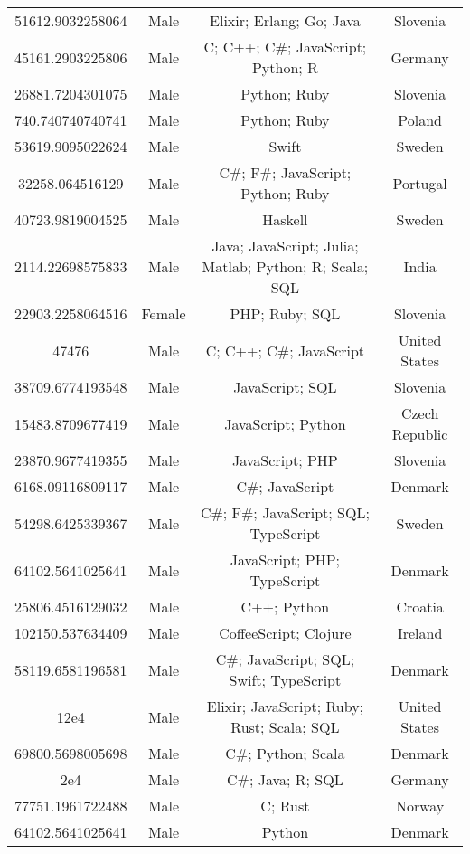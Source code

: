 \begin{center}
\begin{tabular}{ |c|c|c|c| }
51612.9032258064  &  Male  &  Elixir; Erlang; Go; Java  &  Slovenia  \\ 
45161.2903225806  &  Male  &  C; C++; C\#; JavaScript; Python; R  &  Germany  \\ 
26881.7204301075  &  Male  &  Python; Ruby  &  Slovenia  \\ 
740.740740740741  &  Male  &  Python; Ruby  &  Poland  \\ 
53619.9095022624  &  Male  &  Swift  &  Sweden  \\ 
32258.064516129  &  Male  &  C\#; F\#; JavaScript; Python; Ruby  &  Portugal  \\ 
40723.9819004525  &  Male  &  Haskell  &  Sweden  \\ 
2114.22698575833  &  Male  &  Java; JavaScript; Julia; Matlab; Python; R; Scala; SQL  &  India  \\ 
22903.2258064516  &  Female  &  PHP; Ruby; SQL  &  Slovenia  \\ 
47476  &  Male  &  C; C++; C\#; JavaScript  &  United States  \\ 
38709.6774193548  &  Male  &  JavaScript; SQL  &  Slovenia  \\ 
15483.8709677419  &  Male  &  JavaScript; Python  &  Czech Republic  \\ 
23870.9677419355  &  Male  &  JavaScript; PHP  &  Slovenia  \\ 
6168.09116809117  &  Male  &  C\#; JavaScript  &  Denmark  \\ 
54298.6425339367  &  Male  &  C\#; F\#; JavaScript; SQL; TypeScript  &  Sweden  \\ 
64102.5641025641  &  Male  &  JavaScript; PHP; TypeScript  &  Denmark  \\ 
25806.4516129032  &  Male  &  C++; Python  &  Croatia  \\ 
102150.537634409  &  Male  &  CoffeeScript; Clojure  &  Ireland  \\ 
58119.6581196581  &  Male  &  C\#; JavaScript; SQL; Swift; TypeScript  &  Denmark  \\ 
12e4  &  Male  &  Elixir; JavaScript; Ruby; Rust; Scala; SQL  &  United States  \\ 
69800.5698005698  &  Male  &  C\#; Python; Scala  &  Denmark  \\ 
2e4  &  Male  &  C\#; Java; R; SQL  &  Germany  \\ 
77751.1961722488  &  Male  &  C; Rust  &  Norway  \\ 
64102.5641025641  &  Male  &  Python  &  Denmark  \\ 

\end{tabular}
\end{center}
